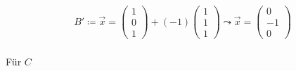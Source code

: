 \begin{gather}
B'\coloneqq \vec{x} = \begin{pmatrix}
1\\0\\1
\end{pmatrix}+(-1) \begin{pmatrix}
1\\1\\1
\end{pmatrix} 
\leadsto \vec{x} =
\begin{pmatrix}
0\\-1\\0
\end{pmatrix}
\end{gather}\\

Für \ensuremath{C}  %

